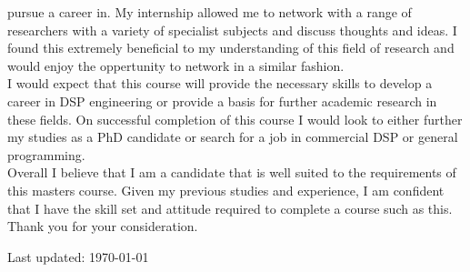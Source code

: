 \documentclass[10pt,letterpaper]{article}
\begin{document}
pursue a career in. My internship allowed me to network with a range of
researchers with a variety of specialist subjects and discuss thoughts and
ideas. I found this extremely beneficial to my understanding of this field of
research and would enjoy the oppertunity to network in a similar fashion.\\
I would expect that this course will provide the necessary skills to develop a
career in DSP engineering or provide a basis for further academic research in
these fields. On successful completion of this course I would look to either
further my studies as a PhD candidate or search for a job in commercial DSP or
general programming.\\
Overall I believe that I am a candidate that is well suited to the requirements
of this masters course. Given my previous studies and experience, I am
confident that I have the skill set and attitude required to complete a course
such as this.\\
\newline
Thank you for your consideration.

\bigskip
{\small Last updated: \today}
\end{document}
